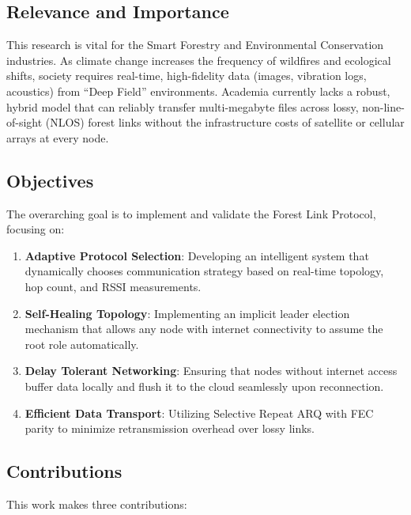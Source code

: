 \documentclass[conference]{IEEEtran}
\begin{document}
\subsection{Relevance and Importance}

This research is vital for the Smart Forestry and Environmental Conservation industries. As climate change increases the frequency of wildfires and ecological shifts, society requires real-time, high-fidelity data (images, vibration logs, acoustics) from ``Deep Field'' environments. Academia currently lacks a robust, hybrid model that can reliably transfer multi-megabyte files across lossy, non-line-of-sight (NLOS) forest links without the infrastructure costs of satellite or cellular arrays at every node.

\subsection{Objectives}

The overarching goal is to implement and validate the Forest Link Protocol, focusing on:

\begin{enumerate}
  \item \textbf{Adaptive Protocol Selection}: Developing an intelligent system that dynamically chooses communication strategy based on real-time topology, hop count, and RSSI measurements.
  \item \textbf{Self-Healing Topology}: Implementing an implicit leader election mechanism that allows any node with internet connectivity to assume the root role automatically.
  \item \textbf{Delay Tolerant Networking}: Ensuring that nodes without internet access buffer data locally and flush it to the cloud seamlessly upon reconnection.
  \item \textbf{Efficient Data Transport}: Utilizing Selective Repeat ARQ with FEC parity to minimize retransmission overhead over lossy links.
\end{enumerate}

\subsection{Contributions}

This work makes three contributions:
\end{document}
